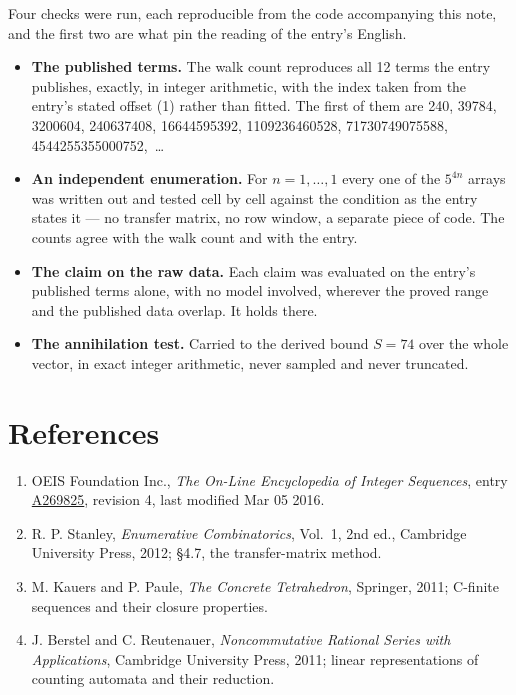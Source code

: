 \documentclass[11pt]{article}
\theoremstyle{definition}
\begin{document}
Four checks were run, each reproducible from the code accompanying this note, and the first two are what pin the reading of the entry's English.

\begin{itemize}

\item {\bfseries The published terms.} The walk count reproduces all 12 terms the entry publishes, exactly, in integer arithmetic, with the index taken from the entry's stated offset (1) rather than fitted. The first of them are 240, 39784, 3200604, 240637408, 16644595392, 1109236460528, 71730749075588, 4544255355000752,~\dots

\item {\bfseries An independent enumeration.} For $n = 1,\dots,1$ every one of the $5^{4n}$ arrays was written out and tested cell by cell against the condition as the entry states it --- no transfer matrix, no row window, a separate piece of code. The counts agree with the walk count and with the entry.

\item {\bfseries The claim on the raw data.} Each claim was evaluated on the entry's published terms alone, with no model involved, wherever the proved range and the published data overlap. It holds there.

\item {\bfseries The annihilation test.} Carried to the derived bound $S = 74$ over the whole vector, in exact integer arithmetic, never sampled and never truncated.

\end{itemize}

\section{References}

\begin{enumerate}

\item OEIS Foundation Inc., \emph{The On-Line Encyclopedia of Integer Sequences}, entry \href{https://oeis.org/A269825}{A269825}, revision 4, last modified Mar 05 2016.

\item R. P. Stanley, \emph{Enumerative Combinatorics}, Vol.~1, 2nd ed., Cambridge University Press, 2012; \S4.7, the transfer-matrix method.

\item M. Kauers and P. Paule, \emph{The Concrete Tetrahedron}, Springer, 2011; C-finite sequences and their closure properties.

\item J. Berstel and C. Reutenauer, \emph{Noncommutative Rational Series with Applications}, Cambridge University Press, 2011; linear representations of counting automata and their reduction.

\end{enumerate}
\end{document}
